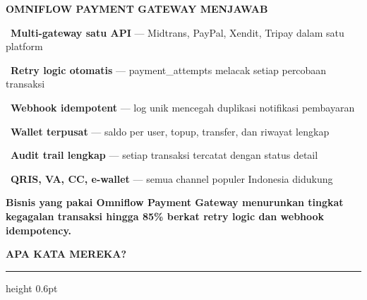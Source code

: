 \documentclass[a4paper]{article}
\newcommand{\sectiontitle}[1]{%
    \vspace{10pt}%
    {\fontsize{13}{16}\selectfont\bfseries\color{BlueDark} #1}\par\vspace{3pt}%
    {\color{BluePrimary}\hrule height 0.6pt}\par\vspace{8pt}%
}
\begin{document}
\begin{minipage}[t]{0.485\textwidth}
    \colorbox{GreenPrimary}{%
        \begin{minipage}{\dimexpr\textwidth-14pt}
            \vspace{5pt}
            {\fontsize{10}{13}\selectfont\bfseries\color{White} OMNIFLOW PAYMENT GATEWAY MENJAWAB}
            \vspace{5pt}
        \end{minipage}}
    \vspace{6pt}

    {\fontsize{9.5}{13}\selectfont\color{TextDark}%
    \textbullet\ \textbf{Multi-gateway satu API} --- Midtrans, PayPal, Xendit, Tripay dalam satu platform\par\vspace{4pt}%
    \textbullet\ \textbf{Retry logic otomatis} --- payment\_attempts melacak setiap percobaan transaksi\par\vspace{4pt}%
    \textbullet\ \textbf{Webhook idempotent} --- log unik mencegah duplikasi notifikasi pembayaran\par\vspace{4pt}%
    \textbullet\ \textbf{Wallet terpusat} --- saldo per user, topup, transfer, dan riwayat lengkap\par\vspace{4pt}%
    \textbullet\ \textbf{Audit trail lengkap} --- setiap transaksi tercatat dengan status detail\par\vspace{4pt}%
    \textbullet\ \textbf{QRIS, VA, CC, e-wallet} --- semua channel populer Indonesia didukung}%
\end{minipage}

\vspace{8pt}

{\setlength{\fboxsep}{7pt}\setlength{\fboxrule}{0pt}%
\noindent\colorbox{GreenPrimary}{%
    \begin{minipage}{\dimexpr\textwidth-2\fboxsep\relax}
        \centering
        {\fontsize{9.5}{12}\selectfont\bfseries\color{White}
        Bisnis yang pakai Omniflow Payment Gateway menurunkan \textbf{tingkat kegagalan transaksi hingga 85\%} berkat retry logic dan webhook idempotency.}
    \end{minipage}}}

\vspace{8pt}
\sectiontitle{APA KATA MEREKA?}
\end{document}
